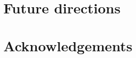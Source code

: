 \documentclass[article]{jss}
\begin{document}
\section[Future directions]{Future directions}

\section[Acknowledgements]{Acknowledgements}


\end{document}
